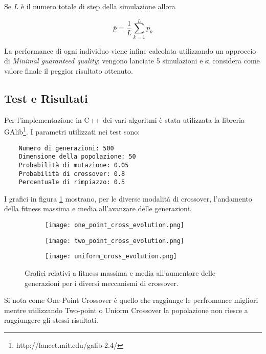 \documentclass[UTF8]{article}
\begin{document}
Se $L$ è il numero totale di step della simulazione allora

\[\bar{p} = \frac{1}{L} \sum_{k=1}^{L}p_k\]

La performance di ogni individuo viene infine calcolata utilizzando un approccio di \textit{Minimal guaranteed quality}: vengono lanciate 5 simulazioni e si considera come valore finale il peggior risultato ottenuto.


\subsection{Test e Risultati}
Per l'implementazione in C++ dei vari algoritmi  è stata utilizzata la libreria GAlib\footnote{http://lancet.mit.edu/galib-2.4/}.
I parametri utilizzati nei test sono:
\begin{verbatim}
    Numero di generazioni: 500
    Dimensione della popolazione: 50
    Probabilità di mutazione: 0.05
    Probabilità di crossover: 0.8
    Percentuale di rimpiazzo: 0.5
\end{verbatim}

I grafici in figura \ref{fig:fitness_evolution} mostrano, per le diverse modalità di crossover, l'andamento della fitness massima e media all'avanzare delle generazioni. 
\begin{figure}[h]
\centering
\begin{subfigure}[b]{0.5\columnwidth}
   \texttt{[image: one\_point\_cross\_evolution.png]}
\end{subfigure}%
\begin{subfigure}[b]{0.5\columnwidth}
   \texttt{[image: two\_point\_cross\_evolution.png]}
\end{subfigure}
\begin{subfigure}[b]{0.5\columnwidth}
   \texttt{[image: uniform\_cross\_evolution.png]}
\end{subfigure}
\caption{Grafici relativi a fitness massima e media all'aumentare delle generazioni per i diversi meccanismi di crossover.}
\label{fig:fitness_evolution}
\end{figure}
Si nota come One-Point Crossover è quello che raggiunge le perfromance migliori mentre utilizzando Two-point o Uniorm Crossover la popolazione non riesce a raggiungere gli stessi risultati. 
\end{document}
